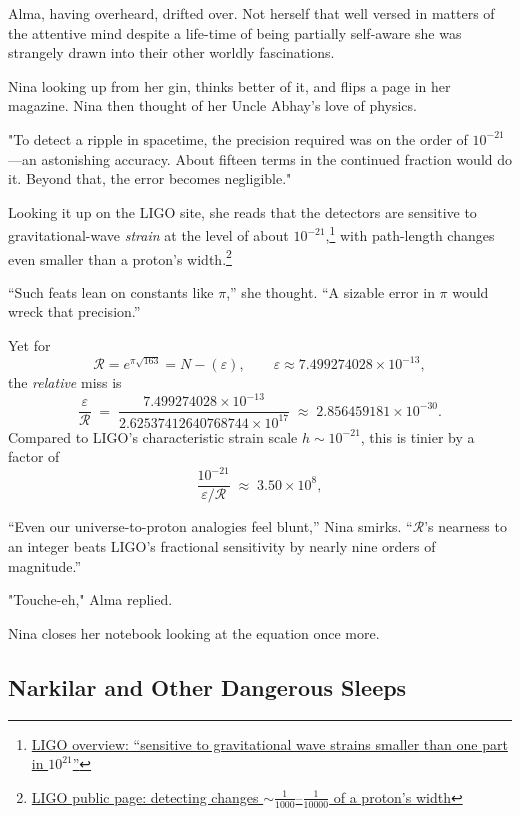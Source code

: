 Alma, having overheard, drifted over. Not herself that well versed in matters of the attentive mind despite a life-time of being partially self-aware she was strangely drawn into their other worldly fascinations.

Nina looking up from her gin, thinks better of it, and flips a page in her magazine. Nina then thought of her Uncle Abhay’s love of physics. 

"To detect a ripple in spacetime, the precision required was on the order of \(10^{-21}\)—an astonishing accuracy. About fifteen terms in the continued fraction would do it. Beyond that, the error becomes negligible."

Looking it up on the LIGO site, she reads that the detectors are sensitive to gravitational-wave \emph{strain} at the level of about $10^{-21}$,\footnote{\href{https://dcc.ligo.org/LIGO-P070082/public}{LIGO overview: “sensitive to gravitational wave strains smaller than one part in $10^{21}$”}} 
with path-length changes even smaller than a proton’s width.\footnote{\href{https://www.ligo.caltech.edu/page/detection}{LIGO public page: detecting changes $\sim \tfrac{1}{1000}$–$\tfrac{1}{10000}$ of a proton’s width}}

“Such feats lean on constants like $\pi$,” she thought. “A sizable error in $\pi$ would wreck that precision.”

Yet for
\[
\mathcal{R}=e^{\pi\sqrt{163}}=N-(\varepsilon),\qquad 
\varepsilon \approx 7.499274028\times 10^{-13},
\]
the \emph{relative} miss is
\[
\frac{\varepsilon}{\mathcal{R}}
\;=\;
\frac{7.499274028\times10^{-13}}{2.62537412640768744\times10^{17}}
\;\approx\;
2.856459181\times 10^{-30}.
\]
Compared to LIGO’s characteristic strain scale $h\sim 10^{-21}$, this is tinier by a factor of
\[
\frac{10^{-21}}{\varepsilon/\mathcal{R}}
\;\approx\;
3.50\times 10^{8},
\]

“Even our universe-to-proton analogies feel blunt,” Nina smirks. “\(\mathcal{R}\)’s nearness to an integer beats LIGO’s fractional sensitivity by nearly nine orders of magnitude.” 

"Touche-eh," Alma replied.

Nina closes her notebook looking at the equation once more. 

\subsection*{Narkilar and Other Dangerous Sleeps}

